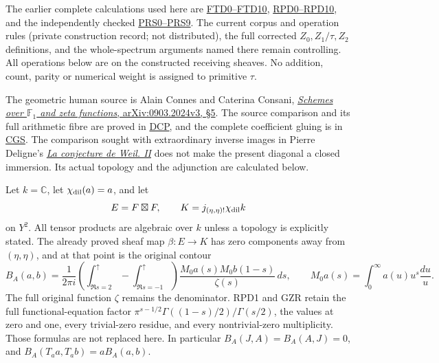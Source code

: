 The earlier complete calculations used here are
\href{https://github.com/KokunoYumeto/zeta-function-research-reader/blob/main/workbenches/splitzero-tandem/continuations/20260925-full-source-tensor-and-original-divisor/counterfactual/FINITE_TOPOLOGY_DUALIZING_COMPLEX.md}{FTD0--FTD10},
\href{https://github.com/KokunoYumeto/zeta-function-research-reader/blob/main/workbenches/splitzero-tandem/continuations/20260925-full-source-tensor-and-original-divisor/counterfactual/RESIDUE_PRODUCT_DIAGONAL_INDEPENDENT.md}{RPD0--RPD10},
and the independently checked
\href{https://github.com/KokunoYumeto/zeta-function-research-reader/blob/main/workbenches/splitzero-tandem/continuations/20260925-full-source-tensor-and-original-divisor/counterfactual/ORIGINAL_RESIDUE_PRODUCT_SHEAF_PAIRING.md}{PRS0--PRS9}.
The current corpus and operation rules (private construction record; not
distributed), the full corrected \(Z_0,Z_1/\tau,Z_2\) definitions, and
the whole-spectrum arguments named there remain controlling. All
operations below are on the constructed receiving sheaves. No addition,
count, parity or numerical weight is assigned to primitive \(\tau\).

The geometric human source is Alain Connes and Caterina Consani,
\href{https://arxiv.org/abs/0903.2024v3}{\emph{Schemes over
\(\mathbb F_1\) and zeta functions}, arXiv:0903.2024v3, §5}. The source
comparison and its full arithmetic fibre are proved in
\href{https://github.com/KokunoYumeto/zeta-function-research-reader/blob/36a82ecca98addb8a98b48204e349737856c7223/workbenches/splitzero-tandem/continuations/20260924-cohomology-weight-and-character-lifts/original-character-lifting/tau_lifting_weights_20260924/SOURCE_CC_DOUBLE_PULLBACK.md}{DCP},
and the complete coefficient gluing is in
\href{https://github.com/KokunoYumeto/zeta-function-research-reader/blob/36a82ecca98addb8a98b48204e349737856c7223/workbenches/splitzero-tandem/continuations/20260924-cohomology-weight-and-character-lifts/original-character-lifting/tau_lifting_weights_20260924/SOURCE_COEFFICIENT_GLUE.md}{CGS}.
The comparison sought with extraordinary inverse images in Pierre
Deligne's
\href{https://www.numdam.org/item/PMIHES_1980__52__137_0/}{\emph{La
conjecture de Weil. II}} does not make the present diagonal a closed
immersion. Its actual topology and the adjunction are calculated below.

Let \(k=\mathbb C\), let \(\chi_{\rm dil}(a)=a\), and let \[
E=F\boxtimes F,\qquad K=j_{(\eta,\eta)!}\chi_{\rm dil}k
\] on \(Y^2\). All tensor products are algebraic over \(k\) unless a
topology is explicitly stated. The already proved sheaf map
\(\beta:E\to K\) has zero components away from \((\eta,\eta)\), and at
that point is the original contour \[
B_A(a,b)=\frac1{2\pi i}
 \left(\int_{\Re s=2}^{\uparrow}-\int_{\Re s=-1}^{\uparrow}\right)
 \frac{M_0a(s)M_0b(1-s)}{\zeta(s)}\,ds,\qquad
M_0a(s)=\int_0^\infty a(u)u^s\frac{du}{u}.
\tag{DER0.1}
\] The full original function \(\zeta\) remains the denominator. RPD1
and GZR retain the full functional-equation factor
\(\pi^{s-1/2}\Gamma((1-s)/2)/\Gamma(s/2)\), the values at zero and one,
every trivial-zero residue, and every nontrivial-zero multiplicity.
Those formulas are not replaced here. In particular
\(B_A(J,A)=B_A(A,J)=0\), and \(B_A(T_aa,T_ab)=aB_A(a,b)\).

